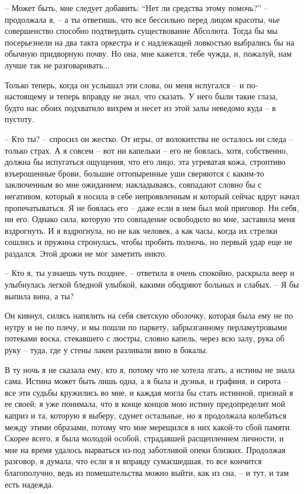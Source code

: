 -- Может  быть, мне следует добавить:  ``Нет ли средства этому  помочь?'' --
продолжала я, --  а ты ответишь, что все бессильно  перед лицом красоты, чье
совершенство  способно  подтвердить  существование  Абсолюта.  Тогда  бы  мы
посерьезнели на два такта оркестра и  с надлежащей ловкостью выбрались бы на
обычную придворную почву.  Но она, мне кажется, тебе чужда,  и, пожалуй, нам
лучше так не разговаривать...

Только  теперь,  когда  он  услышал  эти  слова, он меня испугался -- и
по-настоящему и теперь вправду не знал,  что  сказать.  У  него  были  такие
глаза,  будто нас обоих подхватило вихрем и несет из этой залы неведомо куда
-- в пустоту.

-- Кто ты? -- спросил он жестко. От игры, от волокитства не осталось ни
следа -- только страх. А я совсем -- вот ни  капельки  --  его  не  боялась,
хотя, собственно, должна бы испугаться ощущения, что его лицо, эта угреватая
кожа,  строптиво  взъерошенные  брови,  большие оттопыренные уши сверяются с
каким-то заключенным во мне ожиданием; накладываясь, совпадают словно  бы  с
негативом,  который  я  носила  в  себе непроявленным и который сейчас вдруг
начал пропечатываться. Я не боялась его -- даже если в нем был мой приговор.
Ни себя, ни его. Однако сила, которую  это  совпадение  освободило  во  мне,
заставила  меня  вздрогнуть.  И я вздрогнула, но не как человек, а как часы,
когда их стрелки сошлись и пружина стронулась,  чтобы  пробить  полночь,  но
первый удар еще не раздался. Этой дрожи не мог заметить никто.

-- Кто  я,  ты  узнаешь  чуть  позднее,  --  ответила я очень спокойно,
раскрыла веер и улыбнулась легкой бледной улыбкой, какими ободряют больных и
слабых. -- Я бы выпила вина, а ты?

Он кивнул, силясь напялить на себя светскую оболочку, которая была  ему
не   по  нутру  и  не  по  плечу,  и  мы  пошли  по  паркету,  забрызганному
перламутровыми потеками воска, стекавшего с люстры, словно капель, через всю
залу, рука об руку -- туда, где у стены лакеи разливали вино в бокалы.

В ту ночь я не сказала ему, кто я, потому что не хотела лгать, а истины
не знала сама. Истина может быть лишь одна, а я была и дуэнья, и графиня,  и
сирота -- все эти судьбы кружились во мне, и каждая могла бы стать истинной,
признай  я  ее  своей;  я  уже  понимала,  что  в  конце  концов  мою истину
предопределит мой каприз и та, которую я  выберу,  сдунет  остальные,  но  я
продолжала  колебаться  между этими образами, потому что мне мерещился в них
какой-то сбой памяти.  Скорее  всего,  я  была  молодой  особой,  страдавшей
расщеплением  личности,  и  мне на время удалось вырваться из-под заботливой
опеки  близких.  Продолжая  разговор,  я  думала,  что  если  я  и   вправду
сумасшедшая,  то  все  кончится  благополучно,  ведь из помешательства можно
выйти, как из сна, -- и тут, и там есть надежда.

